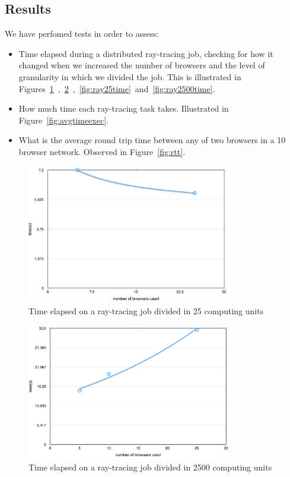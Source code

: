 \subsection{Results}

We have perfomed tests in order to assess:

\begin{itemize}
    \item Time elapsed during a distributed ray-tracing job, checking for how it changed when we increased the number of browsers and the level of granularity in which we divided the job. This is illustrated in Figures~\ref{fig:ray25}~,~\ref{fig:ray2500}~,~\ref{fig:ray25time}~and~\ref{fig:ray2500time}.
    \item How much time each ray-tracing task takes. Illustrated in Figure~\ref{fig:avgtimeexec}.
    \item What is the average round trip time between any of two browsers in a 10 browser network. Observed in Figure~\ref{fig:rtt}.
\end{itemize}

\begin{figure}[h!]
  \centering
  \includegraphics[width=0.8\textwidth]{figs/2.png}
  \caption{Time elapsed on a ray-tracing job divided in 25 computing units}
  \label{fig:ray25}
\end{figure}

\begin{figure}[h!]
  \centering
  \includegraphics[width=0.8\textwidth]{figs/1.png}
  \caption{Time elapsed on a ray-tracing job divided in 2500 computing units}
  \label{fig:ray2500}
\end{figure}

